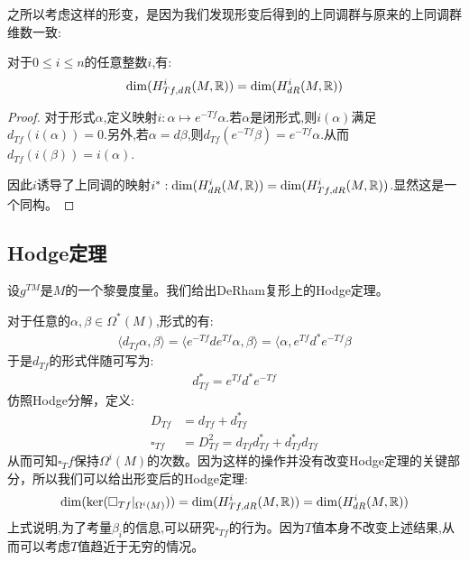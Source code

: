 之所以考虑这样的形变，是因为我们发现形变后得到的上同调群与原来的上同调群维数一致:
\begin{proposition}
	对于$0 \leq i \leq n$的任意整数$i$,有:
	\begin{align*}
		\mathrm{dim}(H^i_{Tf,dR}(M,\mathbb{R}))=\mathrm{dim}(H^i_{dR}(M,\mathbb{R}))
	\end{align*}
\end{proposition}
\begin{proof}
	对于形式$\alpha$,定义映射$i:\alpha \mapsto e^{-Tf}\alpha$.若$\alpha$是闭形式,则$i(\alpha)$满足$d_{Tf}(i(\alpha))=0$.另外,若$\alpha=d \beta$,则$d_{Tf}(e^{-Tf}\beta)=e^{-Tf}\alpha$.从而$d_{Tf}(i(\beta))=i(\alpha)$.

	因此$i$诱导了上同调的映射$i^*:\mathrm{dim}(H^i_{dR}(M,\mathbb{R}))=\mathrm{dim}(H^i_{Tf,dR}(M,\mathbb{R}))$.显然这是一个同构。

\end{proof}
\subsection{Hodge定理}
设$g^{TM}$是$M$的一个黎曼度量。我们给出DeRham复形上的Hodge定理。
\begin{theorem}[Hodge]
	
\end{theorem}
对于任意的$\alpha,\beta \in \Omega^*(M)$,形式的有:
\begin{align*}
	\langle d_{Tf}\alpha,\beta\rangle=\langle e^{-Tf}de^{Tf}\alpha,\beta\rangle=\langle \alpha,e^{Tf}d^*e^{-Tf}\beta
\end{align*}
于是$d_{Tf}$的形式伴随可写为:
\begin{align}
	d_{Tf}^*=e^{Tf}d^*e^{-Tf}
\end{align}
仿照Hodge分解，定义:
\begin{align}
	D_{Tf}&=d_{Tf}+d^*_{Tf}\\
	\square_{Tf}&=D_{Tf}^2=d_{Tf}d^*_{Tf}+d_{Tf}^*d_{Tf}
\end{align}
从而可知$\square_Tf$保持$\Omega^i(M)$的次数。因为这样的操作并没有改变Hodge定理的关键部分，所以我们可以给出形变后的Hodge定理:
\begin{align}
	\mathrm{dim}(\ker(\square_{Tf}|_{\Omega^i(M)}))=\mathrm{dim}(H^i_{Tf,dR}(M,\mathbb{R}))=\mathrm{dim}(H^i_{dR}(M,\mathbb{R}))
\end{align}
上式说明,为了考量$\beta_i$的信息,可以研究$\square_{Tf}$的行为。因为$T$值本身不改变上述结果,从而可以考虑$T$值趋近于无穷的情况。
